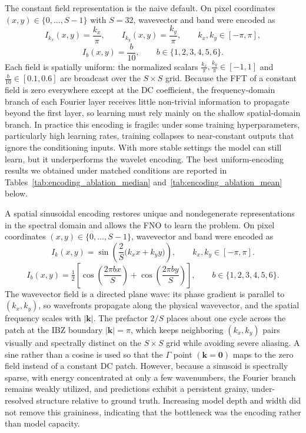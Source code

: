 \documentclass[preprint,review,12pt,numafflabel]{elsarticle}
\begin{document}
The constant field representation is the naive default. On pixel coordinates $(x,y)\in\{0,\ldots,S-1\}$ with $S=32$, wavevector and band were encoded as
\[
I_{k_x}(x,y)=\frac{k_x}{\pi},\qquad I_{k_y}(x,y)=\frac{k_y}{\pi},\qquad k_x,k_y\in[-\pi,\pi],
\]
\[
I_b(x,y)=\frac{b}{10},\qquad b\in\{1,2,3,4,5,6\}.
\]
Each field is spatially uniform: the normalized scalars $\frac{k_x}{\pi},\frac{k_y}{\pi}\in[-1,1]$ and $\frac{b}{10}\in[0.1,0.6]$ are broadcast over the $S\times S$ grid. Because the FFT of a constant field is zero everywhere except at the DC coefficient, the frequency-domain branch of each Fourier layer receives little non-trivial information to propagate beyond the first layer, so learning must rely mainly on the shallow spatial-domain branch. In practice this encoding is fragile: under some training hyperparameters, particularly high learning rates, training collapses to near-constant outputs that ignore the conditioning inputs. With more stable settings the model can still learn, but it underperforms the wavelet encoding. The best uniform-encoding results we obtained under matched conditions are reported in Tables~\ref{tab:encoding_ablation_median} and~\ref{tab:encoding_ablation_mean} below.

A spatial sinusoidal encoding restores unique and nondegenerate representations in the spectral domain and allows the FNO to learn the problem. On pixel coordinates $(x,y)\in\{0,\ldots,S-1\}$, wavevector and band were encoded as
\[
I_k(x,y)=\sin\!\left(\frac{2}{S}\bigl(k_x x+k_y y\bigr)\right),\qquad k_x,k_y\in[-\pi,\pi].
\]
\[
I_b(x,y)=\tfrac{1}{2}\left[\cos\!\left(\frac{2\pi b x}{S}\right)+\cos\!\left(\frac{2\pi b y}{S}\right)\right],\qquad b\in\{1,2,3,4,5,6\}.
\]
The wavevector field is a directed plane wave: its phase gradient is parallel to $(k_x,k_y)$, so wavefronts propagate along the physical wavevector, and the spatial frequency scales with $|\mathbf{k}|$. The prefactor $2/S$ places about one cycle across the patch at the IBZ boundary $|\mathbf{k}|=\pi$, which keeps neighboring $(k_x,k_y)$ pairs visually and spectrally distinct on the $S\times S$ grid while avoiding severe aliasing. A sine rather than a cosine is used so that the $\Gamma$ point $(\mathbf{k}=\mathbf{0})$ maps to the zero field instead of a constant DC patch.
However, because a sinusoid is spectrally sparse, with energy concentrated at only a few wavenumbers, the Fourier branch remains weakly utilized, and predictions exhibit a persistent grainy, under-resolved structure relative to ground truth. Increasing model depth and width did not remove this graininess, indicating that the bottleneck was the encoding rather than model capacity.
\end{document}
